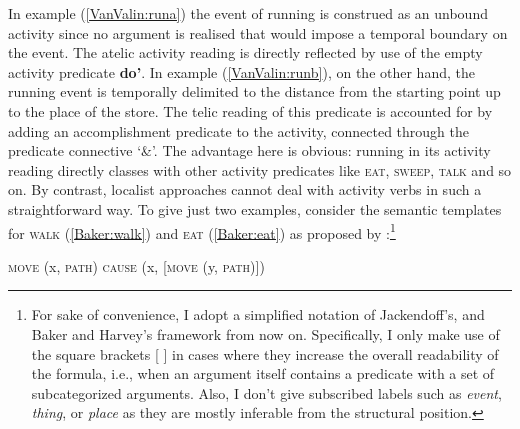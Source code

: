 In example (\ref{VanValin:runa}) the event of running is construed as an unbound activity since no argument is realised that would impose a temporal boundary on the event. The atelic activity reading is directly reflected by use of the empty activity predicate \textbf{do'}. In example (\ref{VanValin:runb}), on the other hand, the running event is temporally delimited to the distance from the starting point up to the place of the store. The telic reading of this predicate is accounted for by adding an accomplishment predicate to the activity, connected through the predicate connective `\&'. The advantage here is obvious: running in its activity reading directly classes with other activity predicates like \textsc{eat}, \textsc{sweep}, \textsc{talk} and so on. By contrast, localist approaches cannot deal with activity verbs in such a straightforward way. To give just two examples, consider the semantic templates for \textsc{walk} (\ref{Baker:walk}) and \textsc{eat} (\ref{Baker:eat}) as proposed by \citet{baker2010complex}:\footnote{For sake of convenience, I adopt a simplified notation of Jackendoff's, and Baker and Harvey's framework from now on. Specifically, I only make use of the square brackets [ ] in cases where they increase the overall readability of the formula, i.e., when an argument itself contains a predicate with a set of subcategorized arguments. Also, I don't give subscribed labels such as \textit{event}, \textit{thing}, or \textit{place} as they are mostly inferable from the structural position.}

\ea \label{Baker}
\ea \textsc{move} (x, \textsc{path}) \label{Baker:walk}
\ex \textsc{cause} (x, [\textsc{move} (y, \textsc{path})]) \label{Baker:eat}
\z
\z

